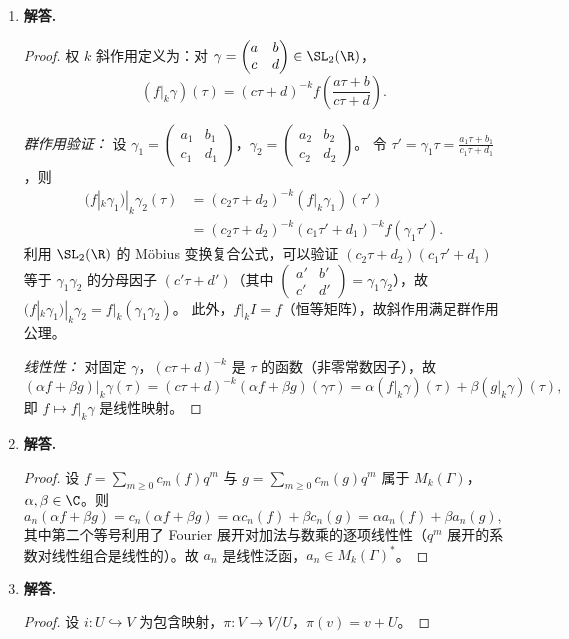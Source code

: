 \begin{enumerate}[label=\textbf{\arabic*.}, leftmargin=*, itemsep=1em]
\item \textbf{解答.}
\begin{proof}
权 $k$ 斜作用定义为：对 $\gamma=\begin{pmatrix}a&b\\c&d\end{pmatrix}\in\SL_2(\R)$，
\[
  (f|_k\gamma)(\tau)=(c\tau+d)^{-k}f\!\left(\frac{a\tau+b}{c\tau+d}\right).
\]

\emph{群作用验证：} 设 $\gamma_1=\begin{pmatrix}a_1&b_1\\c_1&d_1\end{pmatrix}$，$\gamma_2=\begin{pmatrix}a_2&b_2\\c_2&d_2\end{pmatrix}$。
令 $\tau'=\gamma_1\tau=\frac{a_1\tau+b_1}{c_1\tau+d_1}$，则
\begin{align*}
  (f|_k\gamma_1)|_k\gamma_2(\tau)
  &=(c_2\tau+d_2)^{-k}(f|_k\gamma_1)(\tau') \\
  &=(c_2\tau+d_2)^{-k}(c_1\tau'+d_1)^{-k}f(\gamma_1\tau').
\end{align*}
利用 $\SL_2(\R)$ 的 Möbius 变换复合公式，可以验证 $(c_2\tau+d_2)(c_1\tau'+d_1)$ 等于 $\gamma_1\gamma_2$ 的分母因子 $(c'\tau+d')$（其中 $\begin{pmatrix}a'&b'\\c'&d'\end{pmatrix}=\gamma_1\gamma_2$），故 $(f|_k\gamma_1)|_k\gamma_2=f|_k(\gamma_1\gamma_2)$。
此外，$f|_k I=f$（恒等矩阵），故斜作用满足群作用公理。

\emph{线性性：} 对固定 $\gamma$，$(c\tau+d)^{-k}$ 是 $\tau$ 的函数（非零常数因子），故
\[
  (\alpha f+\beta g)|_k\gamma(\tau)=(c\tau+d)^{-k}(\alpha f+\beta g)(\gamma\tau)=\alpha(f|_k\gamma)(\tau)+\beta(g|_k\gamma)(\tau),
\]
即 $f\mapsto f|_k\gamma$ 是线性映射。
\end{proof}

\item \textbf{解答.}
\begin{proof}
设 $f=\sum_{m\ge 0}c_m(f)q^m$ 与 $g=\sum_{m\ge 0}c_m(g)q^m$ 属于 $M_k(\Gamma)$，$\alpha,\beta\in\C$。则
\[
  a_n(\alpha f+\beta g)=c_n(\alpha f+\beta g)=\alpha c_n(f)+\beta c_n(g)=\alpha a_n(f)+\beta a_n(g),
\]
其中第二个等号利用了 Fourier 展开对加法与数乘的逐项线性性（$q^m$ 展开的系数对线性组合是线性的）。故 $a_n$ 是线性泛函，$a_n\in M_k(\Gamma)^*$。
\end{proof}

\item \textbf{解答.}
\begin{proof}
设 $i\colon U\hookrightarrow V$ 为包含映射，$\pi\colon V\to V/U$，$\pi(v)=v+U$。


\end{proof}
\end{enumerate}
